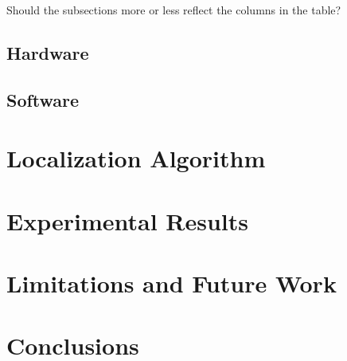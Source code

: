 \documentclass[letterpaper, 10 pt, conference]{ieeeconf}  %
\begin{document}
Should the subsections more or less reflect the columns in the table?

\subsection{Hardware}

\subsection{Software}


\section{Localization Algorithm}

\section{Experimental Results}

\section{Limitations and Future Work}



\section{Conclusions}



\addtolength{\textheight}{-12cm}   %
\end{document}
